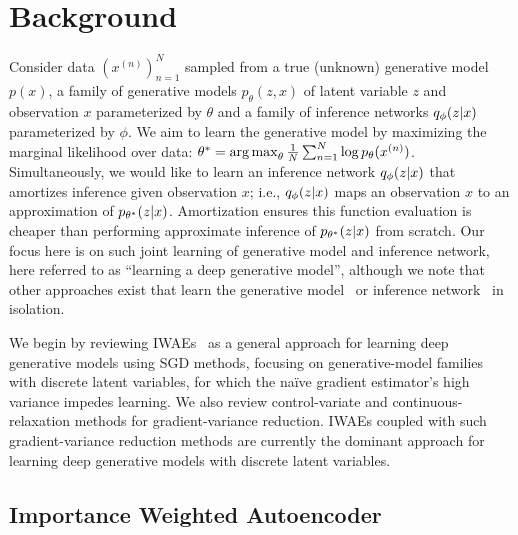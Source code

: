 
\section{Background}
\vspace*{-1ex}
\label{sec:background}

Consider data $(x^{(n)})_{n = 1}^N$ sampled from a true (unknown) generative model $p(x)$, a family of generative models $p_\theta(z, x)$ of latent variable $z$ and observation $x$ parameterized by $\theta$ and a family of inference networks $q_\phi(z \lvert x)$ parameterized by $\phi$.
We aim to learn the generative model by maximizing the marginal likelihood over data: \(\theta^* = \operatorname*{arg\,max}_\theta  \frac{1}{N} \sum_{n = 1}^N  \log p_\theta(x^{(n)})\).
Simultaneously, we would like to learn an inference network $q_\phi(z \lvert x)$ that amortizes inference given observation $x$; i.e., $q_\phi(z \lvert x)$ maps an observation $x$ to an approximation of $p_{\theta^*}(z \lvert x)$.
Amortization ensures this function evaluation is cheaper than performing approximate inference of $p_{\theta^*}(z \lvert x)$ from scratch.
Our focus here is on such joint learning of generative model and inference network, here referred to as ``learning a deep generative model'', although we note that other approaches exist that learn the generative model~\citep{Goodfellow2014generative,Mohamed2016learning} or inference network~\citep{Paige2016inference,Le2017inference} in isolation.

We begin by reviewing \glspl{IWAE}~\citep{Burda2016importance} as a general approach for learning deep generative models using \gls{SGD} methods, focusing on generative-model families with discrete latent variables, for which the na\"ive gradient estimator's high variance impedes learning.
We also review control-variate and continuous-relaxation methods for gradient-variance reduction.
\Glspl{IWAE} coupled with such gradient-variance reduction methods are currently the dominant approach for learning deep generative models with discrete latent variables.

\subsection{Importance Weighted Autoencoder}

